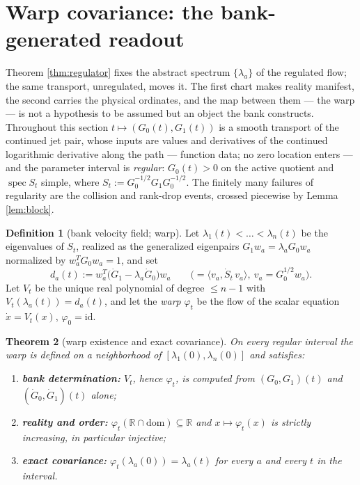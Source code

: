 \documentclass[11pt]{article}
\theoremstyle{plain}
\newtheorem{theorem}{Theorem}
\theoremstyle{definition}
\newtheorem{definition}[theorem]{Definition}
\theoremstyle{remark}
\newcommand{\R}{\mathbb{R}}
\DeclareMathOperator{\spec}{spec}
\begin{document}
\section{Warp covariance: the bank-generated readout}\label{sec:warp}

Theorem \ref{thm:regulator} fixes the abstract spectrum $\{\lambda_a\}$ of the regulated
flow; the same transport, unregulated, moves it. The first chart makes reality manifest,
the second carries the physical ordinates, and the map between them --- the warp --- is
not a hypothesis to be assumed but an object the bank constructs. Throughout this
section $t\mapsto(G_0(t),G_1(t))$ is a smooth transport of the continued jet pair, whose
inputs are values and derivatives of the continued logarithmic derivative along the path
--- function data; no zero location enters --- and the parameter interval is
\emph{regular}: $G_0(t)>0$ on the active quotient and $\spec S_t$ simple, where
$S_t:=G_0^{-1/2}G_1G_0^{-1/2}$. The finitely many failures of regularity are the
collision and rank-drop events, crossed piecewise by Lemma \ref{lem:block}.

\begin{definition}[bank velocity field; warp]\label{def:warp}
Let $\lambda_1(t)<\dots<\lambda_n(t)$ be the eigenvalues of $S_t$, realized as the
generalized eigenpairs $G_1w_a=\lambda_aG_0w_a$ normalized by $w_a^{T}G_0w_a=1$, and set
\[
  d_a(t) := w_a^{T}\bigl(\dot G_1-\lambda_a\dot G_0\bigr)w_a
  \qquad\bigl(=\langle v_a,\dot S_t\,v_a\rangle,\ v_a=G_0^{1/2}w_a\bigr).
\]
Let $V_t$ be the unique real polynomial of degree $\le n-1$ with
$V_t(\lambda_a(t))=d_a(t)$, and let the \emph{warp} $\varphi_t$ be the flow of the
scalar equation $\dot x=V_t(x)$, $\varphi_0=\mathrm{id}$.
\end{definition}

\begin{theorem}[warp existence and exact covariance]\label{thm:warp}
On every regular interval the warp is defined on a neighborhood of
$[\lambda_1(0),\lambda_n(0)]$ and satisfies:
\begin{enumerate}
\item[(i)] \textbf{bank determination:} $V_t$, hence $\varphi_t$, is computed from
$(G_0,G_1)(t)$ and $(\dot G_0,\dot G_1)(t)$ alone;
\item[(ii)] \textbf{reality and order:} $\varphi_t(\R\cap\mathrm{dom})\subseteq\R$ and
$x\mapsto\varphi_t(x)$ is strictly increasing, in particular injective;
\item[(iii)] \textbf{exact covariance:} $\varphi_t(\lambda_a(0))=\lambda_a(t)$ for
every $a$ and every $t$ in the interval.
\end{enumerate}
\end{theorem}
\end{document}
